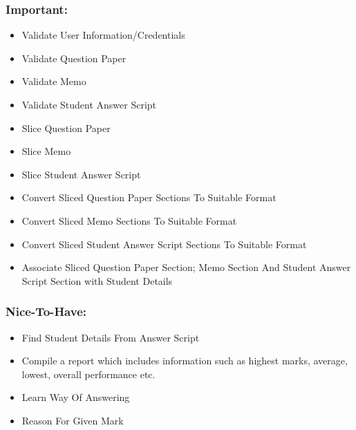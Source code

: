 \documentclass{article}
\begin{document}
		\subsubsection{Important:}
			\begin{itemize}
				\item Validate User Information/Credentials
				\item Validate Question Paper
				\item Validate Memo
				\item Validate Student Answer Script
				\item Slice Question Paper
				\item Slice Memo
				\item Slice Student Answer Script
				\item Convert Sliced Question Paper Sections To Suitable Format
				\item Convert Sliced Memo Sections To Suitable Format
				\item Convert Sliced Student Answer Script Sections To Suitable Format
				\item Associate Sliced Question Paper Section; Memo Section And Student Answer Script Section with Student Details
				
			\end{itemize}
		\subsubsection{Nice-To-Have:}
			\begin{itemize}
				\item Find Student Details From Answer Script
				\item Compile a report which includes information such as highest marks, average, lowest, overall performance etc.
				\item Learn Way Of Answering
				\item Reason For Given Mark
			
			\end{itemize}

	
\end{document}
